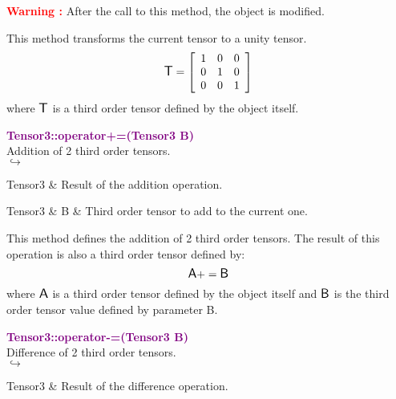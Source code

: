\hspace*{10mm}\textcolor{red}{\textbf{Warning :}} After the call to this method, the object is modified.

This method transforms the current tensor to a unity tensor.
\begin{equation*}
\mbox{\large\ensuremath{\mathsf{T}}}=\left[\begin{array}{ccc}
1&0&0\\
0&1&0\\
0&0&1
\end{array}\right]
\end{equation*}
where $\mbox{\large\ensuremath{\mathsf{T}}}$ is a third order tensor defined by the object itself.

\textcolor{purple}{\textbf{Tensor3::operator+=(Tensor3 B)}}\label{Tensor3::operator+=(Tensor3 B)}\\
Addition of 2 third order tensors.\\ \hspace*{5mm}$\hookrightarrow$
\vspace*{-2em}\begin{tcolorbox}[grow to left by=-1cm, width=\textwidth-1cm,myArgs,tabularx={l|R}]
Tensor3 & Result of the addition operation.
\end{tcolorbox}

\begin{tcolorbox}[width=\textwidth,myArgs,tabularx={ll|R}]
Tensor3 & B & Third order tensor to add to the current one.
\end{tcolorbox}

This method defines the addition of 2 third order tensors.
The result of this operation is also a third order tensor defined by:
\begin{equation*}
\mbox{\large\ensuremath{\mathsf{A}}} += \mbox{\large\ensuremath{\mathsf{B}}}
\end{equation*}
where $\mbox{\large\ensuremath{\mathsf{A}}}$ is a third order tensor defined by the object itself and $\mbox{\large\ensuremath{\mathsf{B}}}$ is the third order tensor value defined by parameter B.

\textcolor{purple}{\textbf{Tensor3::operator-=(Tensor3 B)}}\label{Tensor3::operator-=(Tensor3 B)}\\
Difference of 2 third order tensors.\\ \hspace*{5mm}$\hookrightarrow$
\vspace*{-2em}\begin{tcolorbox}[grow to left by=-1cm, width=\textwidth-1cm,myArgs,tabularx={l|R}]
Tensor3 & Result of the difference operation.
\end{tcolorbox}

